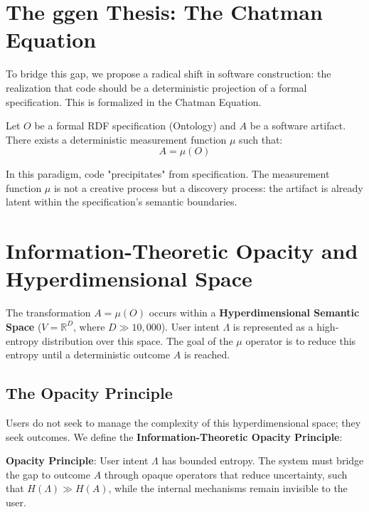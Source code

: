 \section{The ggen Thesis: The Chatman Equation}

To bridge this gap, we propose a radical shift in software construction: the realization that code should be a deterministic projection of a formal specification. This is formalized in the Chatman Equation.

\begin{definition}
    Let $O$ be a formal RDF specification (Ontology) and $A$ be a software artifact. There exists a deterministic measurement function $\mu$ such that:
    \begin{equation}
        A = \mu(O)
    \end{equation}
\end{definition}

In this paradigm, code "precipitates" from specification. The measurement function $\mu$ is not a creative process but a discovery process: the artifact is already latent within the specification's semantic boundaries.

\section{Information-Theoretic Opacity and Hyperdimensional Space}

The transformation $A = \mu(O)$ occurs within a \textbf{Hyperdimensional Semantic Space} ($V = \mathbb{R}^D$, where $D \gg 10,000$). User intent $\Lambda$ is represented as a high-entropy distribution over this space. The goal of the $\mu$ operator is to reduce this entropy until a deterministic outcome $A$ is reached.

\subsection{The Opacity Principle}

Users do not seek to manage the complexity of this hyperdimensional space; they seek outcomes. We define the \textbf{Information-Theoretic Opacity Principle}:

\begin{tcolorbox}[colback=blue!5!white,colframe=blue!75!black]
    \textbf{Opacity Principle}: User intent $\Lambda$ has bounded entropy. The system must bridge the gap to outcome $A$ through opaque operators that reduce uncertainty, such that $H(\Lambda) \gg H(A)$, while the internal mechanisms remain invisible to the user.
\end{tcolorbox}

